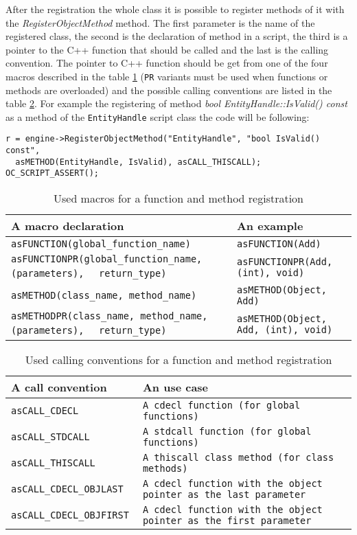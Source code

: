 After the registration the whole class it is possible to register methods of it with the \emph{RegisterObjectMethod} method. The first parameter is the name of the registered class, the second is the declaration of method in a script, the third is a pointer to the C++ function that should be called and the last is the calling convention. The pointer to C++ function should be get from one of the four macros described in the table \ref{tab:script-macros} (\verb/PR/ variants must be used when functions or methods are overloaded) and the possible calling conventions are listed in the table \ref{tab:script-conventions}. For example the registering of method \emph{bool EntityHandle::IsValid() const} as a method of the \verb/EntityHandle/ script class the code will be following:

{\footnotesize\begin{verbatim}
r = engine->RegisterObjectMethod("EntityHandle", "bool IsValid() const",
  asMETHOD(EntityHandle, IsValid), asCALL_THISCALL); OC_SCRIPT_ASSERT();
\end{verbatim}}

\begin{table}[htbp]
	\centering
		{\scriptsize
		\begin{tabular}{|p{0.55\hsize}|p{0.38\hsize}|}
		\hline
		A macro declaration & An example\\
		\hline
		\verb/asFUNCTION(global_function_name)/ & \verb/asFUNCTION(Add)/\\
		\verb/asFUNCTIONPR(global_function_name, (parameters),/ \verb/  return_type)/ & \verb/asFUNCTIONPR(Add, (int), void)/\\
		\verb/asMETHOD(class_name, method_name)/ & \verb/asMETHOD(Object, Add)/\\
		\verb/asMETHODPR(class_name, method_name, (parameters),/ \verb/  return_type)/ & \verb/asMETHOD(Object, Add, (int), void)/\\
		\hline
		\end{tabular}
		}
	\caption{Used macros for a function and method registration}
	\label{tab:script-macros}
\end{table}

\begin{table}[htbp]
	\centering
		{\scriptsize
		\begin{tabular}{|p{0.24\hsize}|p{0.69\hsize}|}
		\hline
		A call convention & An use case\\
		\hline
		\verb/asCALL_CDECL/ & \verb/A cdecl function (for global functions)/\\
		\verb/asCALL_STDCALL/ & \verb/A stdcall function (for global functions)/\\
		\verb/asCALL_THISCALL / & \verb/A thiscall class method (for class methods)/\\
		\verb/asCALL_CDECL_OBJLAST / & \verb/A cdecl function with the object pointer as the last parameter/\\
		\verb/asCALL_CDECL_OBJFIRST / & \verb/A cdecl function with the object pointer as the first parameter/\\
		\hline
		\end{tabular}
		}
	\caption{Used calling conventions for a function and method registration}
	\label{tab:script-conventions}
\end{table}

